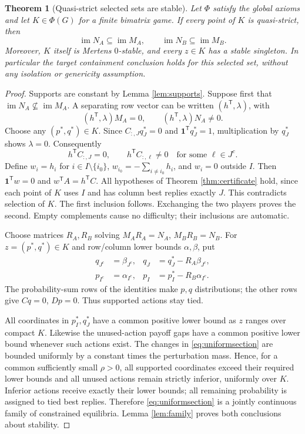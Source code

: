 \documentclass[11pt]{article}
\newcommand{\im}{\operatorname{im}}
\newcommand{\one}{\mathbf 1}
\newtheorem{theorem}{Theorem}[section]
\theoremstyle{definition}
\theoremstyle{remark}
\begin{document}
\begin{theorem}[Quasi-strict selected sets are stable]\label{thm:qs}
Let $\Phi$ satisfy the global axioms and let $K\in\Phi(G)$ for a finite
bimatrix game. If every point of $K$ is quasi-strict, then
\[
 \im N_A\subseteq\im M_A,\qquad \im N_B\subseteq\im M_B.
\]
Moreover, $K$ itself is Mertens $0$-stable, and every $z\in K$ has a
stable singleton. In particular the target containment conclusion holds
for this selected set, without any isolation or genericity assumption.
\end{theorem}
\begin{proof}
Supports are constant by Lemma \ref{lem:supports}. Suppose first that
$\im N_A\not\subseteq\im M_A$. A separating row vector can be written
$(h^{\mathsf T},\lambda)$, with
\[
 (h^{\mathsf T},\lambda)M_A=0,\qquad
 (h^{\mathsf T},\lambda)N_A\ne0.
\]
Choose any $(p^*,q^*)\in K$. Since $C_{:,J}q_J^*=0$ and
$\one^{\mathsf T}q_J^*=1$, multiplication by $q_J^*$ shows
$\lambda=0$. Consequently
\[
 h^{\mathsf T}C_{:,J}=0,\qquad h^{\mathsf T}C_{:,\ell}\ne0
 \quad\text{for some }\ell\in J^c.
\]
Define $w_i=h_i$ for $i\in I\setminus\{i_0\}$,
$w_{i_0}=-\sum_{i\ne i_0}h_i$, and $w_i=0$ outside $I$.
Then $\one^{\mathsf T}w=0$ and $w^{\mathsf T}A=h^{\mathsf T}C$.
All hypotheses of Theorem \ref{thm:certificate} hold, since each point
of $K$ uses $I$ and has column best replies exactly $J$. This contradicts
selection of $K$. The first inclusion follows. Exchanging the two players
proves the second. Empty complements cause no difficulty; their inclusions
are automatic.

Choose matrices $R_A,R_B$ solving $M_AR_A=N_A$, $M_BR_B=N_B$.
For $z=(p^*,q^*)\in K$ and row/column lower bounds $\alpha,\beta$, put
\begin{equation}\label{eq:uniformsection}
 \begin{aligned}
 q_{J^c}&=\beta_{J^c},&q_J&=q_J^*-R_A\beta_{J^c},\\
 p_{I^c}&=\alpha_{I^c},&p_I&=p_I^*-R_B\alpha_{I^c}.
 \end{aligned}
\end{equation}
The probability-sum rows of the identities make $p,q$ distributions;
the other rows give $Cq=0$, $Dp=0$. Thus supported actions stay tied.

All coordinates in $p_I^*,q_J^*$ have a common positive lower bound as
$z$ ranges over compact $K$. Likewise the unused-action payoff gaps have
a common positive lower bound whenever such actions exist. The changes
in \eqref{eq:uniformsection} are bounded uniformly by a constant times
the perturbation mass. Hence, for a common sufficiently small $\rho>0$,
all supported coordinates exceed their required lower bounds and all
unused actions remain strictly inferior, uniformly over $K$.
Inferior actions receive exactly their lower bounds; all remaining
probability is assigned to tied best replies. Therefore
\eqref{eq:uniformsection} is a jointly continuous family of constrained
equilibria. Lemma \ref{lem:family} proves both conclusions about stability.
\end{proof}
\end{document}
